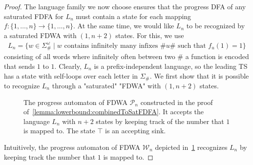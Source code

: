 \documentclass[a4paper,USenglish,cleveref,autoref,thm-restate]{lipics-v2021}
\newcommand{\mc}[1]{\ensuremath{\mathcal{#1}}}
\newcommand{\W}{\mc{W}}
\renewcommand{\P}{\mc{P}}
\newcommand{\eps}{\ensuremath{\varepsilon}}
\begin{document}
{\begin{proof}
  The language family we now choose ensures that the progress DFA of any saturated FDFA for $L_n$ must contain a state for each mapping $f: \{1,\dotsc,n\} \to \{1,\dotsc,n\}$.
  At the same time, we would like $L_n$ to be recognized by a saturated FDWA with $(1, n+2)$ states.
  For this, we use
  \begin{align*}
    L_n = \{w \in \Sigma_\#^\omega \mid \text{$w$ contains infinitely many infixes $\#u\#$ such that $f_u(1) = 1$}\}
  \end{align*}
  consisting of all words where infinitely often between two $\#$ a function is encoded that sends $1$ to $1$.
  Clearly, $L_n$ is a prefix-independent language, so the leading TS has a state with self-loops over each letter in $\Sigma_{\#}$.
  We first show that it is possible to recognize $L_n$ through a "saturated" "FDWA" with $(1, n+2)$ states.
  \begin{figure}[ht]
    \centering
    \caption{
      The progress automaton of FDWA $\P_n$ constructed in the proof
      of~\cref{lemma:lowerbound:combinedToSatFDFA}.
      It accepts the language $L_n$ with $n+2$ states by keeping
      track of the number that $1$ is mapped to.
      The state $\top$ is an accepting sink.
}
    \label{figure:lowerboundfwpm}
  \end{figure}
  Intuitively, the progress automaton of FDWA $\W_n$ depicted in~\cref{figure:lowerboundfwpm} recognizes $L_n$ by keeping track the number that $1$ is mapped to.


\end{proof}}
\end{document}
